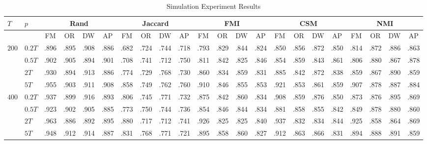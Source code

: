 \begin{sidewaystable}
\centering
\caption{Simulation Experiment Results}
\small
\begin{tabular}{llcccccccccccccccccccc}
\hline
$T$& $p$& \multicolumn{4}{c}{\sf Rand} &\multicolumn{4}{c}{\sf Jaccard}& \multicolumn{4}{c}{\sf FMI}& \multicolumn{4}{c}{\sf CSM}& \multicolumn{4}{c}{\sf NMI}\\
\hline
		& 			& FM & OR & DW & AP & FM & OR & DW & AP & FM & OR & DW & AP & FM & OR & DW & AP & FM & OR & DW & AP \\
$200$ 	& $0.2T$ 	& .896& .895& .908& .886& .682& .724& .744& .718& .793& .829& .844& .824& .850& .856& .872& .850& .814& .872& .886& .863\\
		& $0.5T$ 	& .902& .905& .894& .901& .708& .741& .712& .750& .811& .842& .825& .846& .854& .859& .843& .861& .806& .880& .867& .878\\
		& $2T$ 		& .930& .894& .913& .886& .774& .729& .768& .730& .860& .834& .859& .831& .885& .842& .872& .838& .859& .867& .890& .859\\
		& $5T$ 		& .955& .903& .911& .908& .858& .749& .762& .760& .910& .846& .855& .853& .921& .853& .861& .859& .907& .878& .887& .884\\
\hline
$400$ 	& $0.2T$ 	& .937& .899& .916& .893& .806& .745& .771& .732& .875& .842& .860& .834& .908& .859& .876& .850& .873& .876& .895& .869\\
		& $0.5T$ 	& .923& .902& .905& .885& .773& .750& .744& .736& .854& .846& .844& .834& .881& .858& .855& .842& .849& .878& .880& .860\\
		& $2T$ 		& .963& .886& .892& .895& .880& .717& .712& .741& .926& .825& .825& .840& .937& .832& .834& .844& .925& .858& .864& .869\\
		& $5T$ 		& .948& .912& .914& .887& .831& .768& .771& .721& .895& .858& .860& .827& .912& .863& .866& .831& .894& .888& .891& .859\\

\end{tabular}
\end{sidewaystable}
